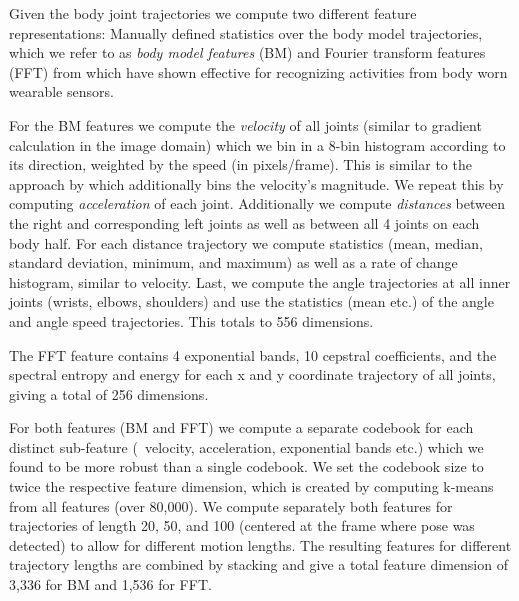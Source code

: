 Given the body joint trajectories we compute two different feature representations: Manually defined statistics over the body model trajectories, which we refer to as \emph{body model features} (BM) and Fourier transform features (FFT) from \citet{zinnen09iswc} which have shown effective for recognizing activities from body worn wearable sensors.

For the BM features we compute the \emph{velocity} of all joints (similar to gradient calculation in the image domain) which we bin in a 8-bin histogram according to its direction, weighted by the speed (in pixels/frame). This is similar to the approach by \citet{messing09iccv} which additionally bins the velocity's magnitude. We repeat this by computing \emph{acceleration} of each joint. Additionally we compute \emph{distances} between the right and corresponding left joints as well as between all 4 joints on each body half. For each distance trajectory we compute statistics (mean, median, standard deviation, minimum, and maximum) as well as a rate of change histogram, similar to velocity. Last, we compute the angle trajectories at all inner joints (wrists, elbows, shoulders) and use the statistics (mean etc.) of the angle and angle speed trajectories. This totals to 556 dimensions.

The FFT feature contains 4 exponential bands, 10 cepstral coefficients, and the spectral entropy and energy for each x and y coordinate trajectory of all joints, giving a total of 256 dimensions. 

For both features (BM and FFT) we compute a separate codebook for each distinct sub-feature (\ie\ velocity, acceleration, exponential bands etc.) which we found to be more robust than a single codebook. We set the codebook size to twice the respective feature dimension, which is created by computing k-means from all features (over 80,000).
%
We compute separately both features for trajectories of length 20, 50, and 100 (centered at the frame where pose was detected) to allow for different motion lengths. The resulting features for different trajectory lengths are combined by stacking and give a total feature dimension of 3,336 for BM and 1,536 for FFT.
